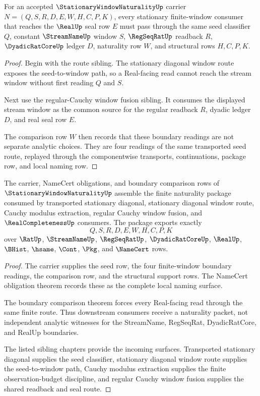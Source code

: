 \begin{theorem}
\label{thm:stationary-window-naturality-boundary-comparison}
For an accepted $\StationaryWindowNaturalityUp$ carrier $N=(Q,S,R,D,E,W,H,C,P,K)$, every stationary finite-window consumer that reaches the $\RealUp$ seal row $E$ must pass through the same seed classifier $Q$, constant $\StreamNameUp$ window $S$, $\RegSeqRatUp$ readback $R$, $\DyadicRatCoreUp$ ledger $D$, naturality row $W$, and structural rows $H,C,P,K$.
\end{theorem}
\begin{proof}
Begin with the route sibling. The stationary diagonal window route exposes the seed-to-window path, so a Real-facing read cannot reach the stream window without first reading $Q$ and $S$.

Next use the regular-Cauchy window fusion sibling. It consumes the displayed stream window as the common source for the regular readback $R$, dyadic ledger $D$, and real seal row $E$.

The comparison row $W$ then records that these boundary readings are not separate analytic choices. They are four readings of the same transported seed route, replayed through the componentwise transports, continuations, package row, and local naming row.
\end{proof}

\begin{theorem}
\label{thm:stationary-window-naturality-downstream-package}
The carrier, NameCert obligations, and boundary comparison rows of $\StationaryWindowNaturalityUp$ assemble the finite naturality package consumed by transported stationary diagonal, stationary diagonal window route, Cauchy modulus extraction, regular Cauchy window fusion, and $\RealCompletenessUp$ consumers. The package exports exactly
$$
Q,S,R,D,E,W,H,C,P,K
$$
over $\RatUp$, $\StreamNameUp$, $\RegSeqRatUp$, $\DyadicRatCoreUp$, $\RealUp$, $\BHist$, $\hsame$, $\Cont$, $\Pkg$, and $\NameCert$ rows.
\end{theorem}
\begin{proof}
The carrier supplies the seed row, the four finite-window boundary readings, the comparison row, and the structural support rows. The NameCert obligation theorem records these as the complete local naming surface.

The boundary comparison theorem forces every Real-facing read through the same finite route. Thus downstream consumers receive a naturality packet, not independent analytic witnesses for the StreamName, RegSeqRat, DyadicRatCore, and RealUp boundaries.

The listed sibling chapters provide the incoming surfaces. Transported stationary diagonal supplies the seed classifier, stationary diagonal window route supplies the seed-to-window path, Cauchy modulus extraction supplies the finite observation-budget discipline, and regular Cauchy window fusion supplies the shared readback and seal route.
\end{proof}

